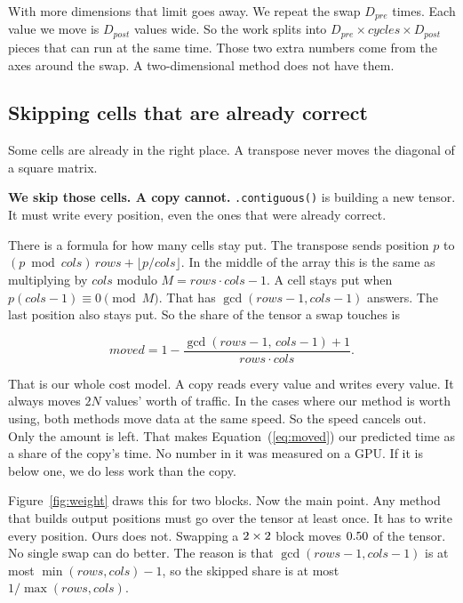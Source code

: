 With more dimensions that limit goes away. We repeat the swap $D_{pre}$ times.
Each value we move is $D_{post}$ values wide. So the work splits into
$D_{pre} \times \mathit{cycles} \times D_{post}$ pieces that can run at the
same time. Those two extra numbers come from the axes around the swap. A
two-dimensional method does not have them.

\subsection{Skipping cells that are already correct}
\label{sec:fixedpoints}

Some cells are already in the right place. A transpose never moves the diagonal
of a square matrix.

\textbf{We skip those cells. A copy cannot.} \texttt{.contiguous()} is building
a new tensor. It must write every position, even the ones that were already
correct.

There is a formula for how many cells stay put. The transpose sends position
$p$ to $(p \bmod \mathit{cols})\,\mathit{rows} + \lfloor p/\mathit{cols}\rfloor$.
In the middle of the array this is the same as multiplying by $\mathit{cols}$
modulo $M = \mathit{rows}\cdot\mathit{cols}-1$. A cell stays put when
$p(\mathit{cols}-1) \equiv 0 \pmod M$. That has
$\gcd(\mathit{rows}-1,\mathit{cols}-1)$ answers. The last position also stays
put. So the share of the tensor a swap touches is

\begin{equation}
\mathit{moved} = 1 - \frac{\gcd(\mathit{rows}-1,\,\mathit{cols}-1) + 1}
                         {\mathit{rows}\cdot\mathit{cols}} .
\label{eq:moved}
\end{equation}

That is our whole cost model. A copy reads every value and writes every value.
It always moves $2N$ values' worth of traffic. In the cases where our method is
worth using, both methods move data at the same speed. So the speed cancels
out. Only the amount is left. That makes Equation~(\ref{eq:moved}) our
predicted time as a share of the copy's time. No number in it was measured on a
GPU. If it is below one, we do less work than the copy.



Figure~\ref{fig:weight} draws this for two blocks. Now the main point. Any
method that builds output positions must go over the
tensor at least once. It has to write every position. Ours does not. Swapping a
$2 \times 2$ block moves $0.50$ of
the tensor. No single swap can do better. The reason is that
$\gcd(\mathit{rows}-1,\mathit{cols}-1)$ is at most
$\min(\mathit{rows},\mathit{cols})-1$, so the skipped share is at most
$1/\max(\mathit{rows},\mathit{cols})$.

